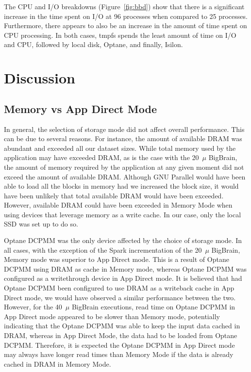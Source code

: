 \documentclass[conference]{IEEEtran}
\newcommand{\bigbrain}{BigBrain\xspace}
\begin{document}
The CPU and I/O breakdowns (Figure~\ref{fig:bbd}) show that there is a significant increase
in the time spent on I/O at 96 processes when compared to 25 processes. Furthermore, there appears
to also be an increase in the amount of time spent on CPU processing. In both cases,
tmpfs spends the least amount of time on I/O and CPU, followed by local disk, Optane, and finally,
Isilon.
\section{Discussion}
\subsection{Memory vs App Direct Mode}

In general, the selection of storage mode did not affect overall performance. This can be
due to several reasons. For instance, the amount of available DRAM was abundant and exceeded 
all our dataset sizes. While total memory used by the application may have exceeded DRAM, as is the
case with the 20~$\mu$ \bigbrain, the amount of memory required by the application at any 
given moment did not exceed the amount of available DRAM. Although GNU Parallel would have
been able to load all the blocks in memory had we increased the block size, it would have been unlikely
that total available DRAM would have been exceeded. However, available DRAM could have been exceeded in
Memory Mode when using devices that leverage memory as a write cache.
In our case, only the local SSD was set up to do so.

Optane DCPMM was the only device affected by the choice of storage mode. In all cases, with the 
exception of the Spark incrementation of the 20~$\mu$ \bigbrain, Memory mode was superior to 
App Direct mode. This is a result of Optane DCPMM using DRAM as cache in Memory mode, whereas Optane
DCPMM 
was configured as a writethrough device in App Direct mode. It is believed that had Optane DCPMM been
configured to use DRAM as a writeback cache in App Direct mode, we would have observed a similar
performance between the two. However, for the 40~$\mu$ \bigbrain executions, read time on Optane DCPMM in
App Direct mode appeared to be slower than Memory mode, potentially indicating that the Optane DCPMM was able
to keep the input data cached in DRAM, whereas in App Direct Mode, the data had to be loaded from Optane DCPMM.
Therefore, it is expected the Optane DCPMM in App Direct mode may always have longer read times than Memory Mode
if the data is already cached in DRAM in Memory Mode.
\end{document}
